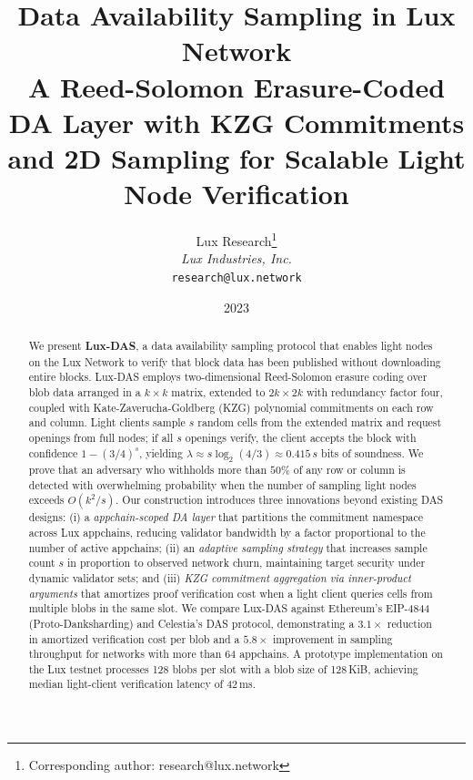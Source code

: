 \documentclass[11pt,a4paper]{article}
\title{\textbf{Data Availability Sampling in Lux Network}\\
\large A Reed-Solomon Erasure-Coded DA Layer with KZG Commitments\\
and 2D Sampling for Scalable Light Node Verification}
\author{
Lux Research\thanks{Corresponding author: research@lux.network}\\
\textit{Lux Industries, Inc.}\\
\texttt{research@lux.network}
}
\date{2023}
\theoremstyle{plain}
\theoremstyle{definition}
\theoremstyle{remark}
\begin{document}
\luxcoverpage

\begin{abstract}
We present \textbf{Lux-DAS}, a data availability sampling protocol that enables light nodes
on the Lux Network to verify that block data has been published without downloading entire
blocks. Lux-DAS employs two-dimensional Reed-Solomon erasure coding over blob data arranged
in a $k \times k$ matrix, extended to $2k \times 2k$ with redundancy factor four, coupled
with Kate-Zaverucha-Goldberg (KZG) polynomial commitments on each row and column. Light
clients sample $s$ random cells from the extended matrix and request openings from full nodes;
if all $s$ openings verify, the client accepts the block with confidence
$1 - (3/4)^s$, yielding $\lambda \approx s\log_2(4/3) \approx 0.415\,s$ bits of soundness. We prove that
an adversary who withholds more than $50\%$ of any row or column is detected with
overwhelming probability when the number of sampling light nodes exceeds
$O(k^2 / s)$. Our construction introduces three innovations beyond existing DAS designs:
(i) a \emph{appchain-scoped DA layer} that partitions the commitment namespace across Lux
appchains, reducing validator bandwidth by a factor proportional to the number of active appchains;
(ii) an \emph{adaptive sampling strategy} that increases sample count $s$ in proportion to
observed network churn, maintaining target security under dynamic validator sets; and
(iii) \emph{KZG commitment aggregation via inner-product arguments} that amortizes proof
verification cost when a light client queries cells from multiple blobs in the same slot.
We compare Lux-DAS against Ethereum's EIP-4844 (Proto-Danksharding) and Celestia's DAS
protocol, demonstrating a $3.1\times$ reduction in amortized verification cost per blob
and a $5.8\times$ improvement in sampling throughput for networks with more than 64 appchains.
A prototype implementation on the Lux testnet processes 128 blobs per slot with a
blob size of 128\,KiB, achieving median light-client verification latency of 42\,ms.
\end{abstract}

\tableofcontents
\newpage













\end{document}
